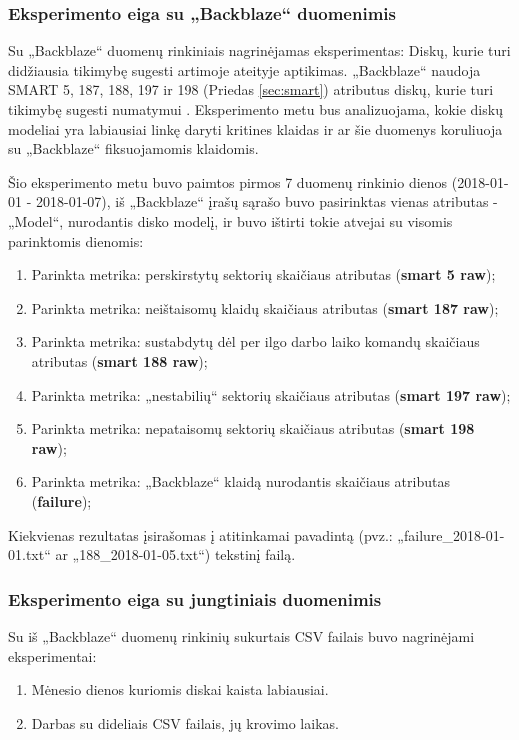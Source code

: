 \documentclass{VUMIFPSkursinis}
\begin{document}
\subsubsection{Eksperimento eiga su „Backblaze“ duomenimis}
Su „Backblaze“ duomenų rinkiniais nagrinėjamas eksperimentas: Diskų, kurie turi didžiausia tikimybę sugesti artimoje ateityje aptikimas. „Backblaze“ naudoja SMART 5, 187, 188, 197 ir 198 (Priedas \ref{sec:smart}) atributus diskų, kurie turi tikimybę sugesti numatymui \cite{backblaze_failure}. Eksperimento metu bus analizuojama, kokie diskų modeliai yra labiausiai linkę daryti kritines klaidas ir ar šie duomenys koruliuoja su „Backblaze“ fiksuojamomis klaidomis.\par
Šio eksperimento metu buvo paimtos pirmos 7 duomenų rinkinio dienos (2018-01-01 - 2018-01-07), iš „Backblaze“ įrašų sąrašo buvo pasirinktas vienas atributas - „Model“, nurodantis disko modelį, ir buvo ištirti tokie atvejai su visomis parinktomis dienomis:
\begin{enumerate}
\item Parinkta metrika: perskirstytų sektorių skaičiaus atributas (\textbf{smart 5 raw});
\item Parinkta metrika: neištaisomų klaidų skaičiaus atributas (\textbf{smart 187 raw});
\item Parinkta metrika: sustabdytų dėl per ilgo darbo laiko komandų skaičiaus atributas (\textbf{smart 188 raw});
\item Parinkta metrika: „nestabilių“ sektorių skaičiaus atributas (\textbf{smart 197 raw});
\item Parinkta metrika: nepataisomų sektorių skaičiaus atributas (\textbf{smart 198 raw});
\item Parinkta metrika: „Backblaze“ klaidą nurodantis skaičiaus atributas (\textbf{failure});
\end{enumerate}
Kiekvienas rezultatas įsirašomas į atitinkamai pavadintą (pvz.: „failure\_2018-01-01.txt“ ar „188\_2018-01-05.txt“) tekstinį failą.

\subsubsection{Eksperimento eiga su jungtiniais duomenimis}
Su iš „Backblaze“ duomenų rinkinių sukurtais CSV failais buvo nagrinėjami eksperimentai:
\begin{enumerate}
\item Mėnesio dienos kuriomis diskai kaista labiausiai.
\item Darbas su dideliais CSV failais, jų krovimo laikas.
\end{enumerate}
\end{document}
